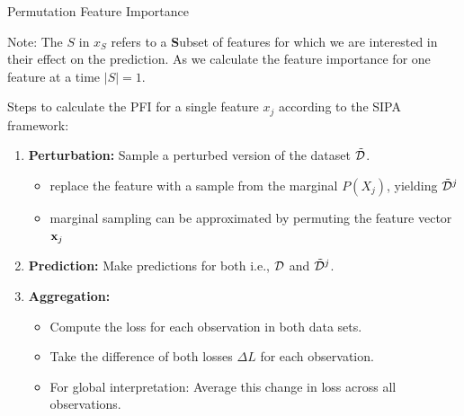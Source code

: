 \documentclass[11pt,compress,t,notes=noshow, xcolor=table]{beamer}
\begin{document}
\begin{vbframe}{Permutation Feature Importance}
\vspace*{0.2cm}
{\scriptsize{Note: 
The $S$ in $x_S$ refers to a \textbf{S}ubset of features for which we are interested in their effect on the prediction.
As we calculate the feature importance for one feature at a time $|S| = 1$.}\par}

\framebreak 

Steps to calculate the PFI for a single feature $x_j$ according to the SIPA framework:
\lz
\begin{enumerate}
  \item \textbf{Perturbation:} Sample a perturbed version of the dataset $\pert{\D}{}{}$.
  \begin{itemize}
    \item replace the feature with a sample from the marginal $P(X_j)$, yielding $\pert{\D}{j}{}$
    \item marginal sampling can be approximated by permuting the feature vector $\xj$
    \end{itemize}
  \item \textbf{Prediction:} Make predictions for both i.e., $\D$ and $\pert{\D}{j}{}$.
  \item \textbf{Aggregation:} 
    \begin{itemize}
      \item Compute the loss for each observation in both data sets.
      \item Take the difference of both losses $\Delta L$ for each observation.
      \item For global interpretation: Average this change in loss across all observations.
    \end{itemize}
\end{enumerate}
\lz
\end{vbframe}
\end{document}
